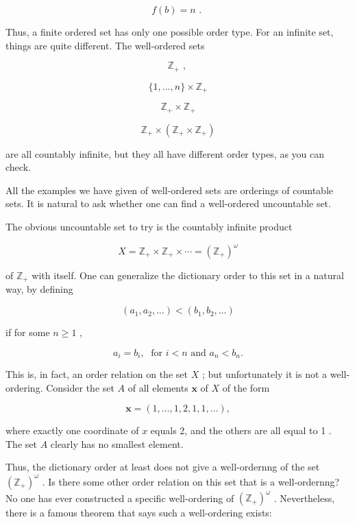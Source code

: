 \documentclass[10pt]{article}
\begin{document}
\[
f\left( b\right)  = n\text{ . }
\]

Thus, a finite ordered set has only one possible order type. For an infinite set, things are quite different. The well-ordered sets

\[
{\mathbb{Z}}_{ + }\text{ , }
\]

\[
\{ 1,\ldots ,n\}  \times  {\mathbb{Z}}_{ + }
\]

\[
{\mathbb{Z}}_{ + } \times  {\mathbb{Z}}_{ + }
\]

\[
{\mathbb{Z}}_{ + } \times  \left( {{\mathbb{Z}}_{ + } \times  {\mathbb{Z}}_{ + }}\right)
\]

are all countably infinite, but they all have different order types, as you can check.

All the examples we have given of well-ordered sets are orderings of countable sets. It is natural to ask whether one can find a well-ordered uncountable set.

The obvious uncountable set to try is the countably infinite product

\[
X = {\mathbb{Z}}_{ + } \times  {\mathbb{Z}}_{ + } \times  \cdots  = {\left( {\mathbb{Z}}_{ + }\right) }^{\omega }
\]

of \({\mathbb{Z}}_{ + }\) with itself. One can generalize the dictionary order to this set in a natural way, by defining

\[
\left( {{a}_{1},{a}_{2},\ldots }\right)  < \left( {{b}_{1},{b}_{2},\ldots }\right)
\]

if for some \(n \geq  1\) ,

\[
{a}_{i} = {b}_{i},\;\text{ for }i < n\text{ and }{a}_{n} < {b}_{n}.
\]

This is, in fact, an order relation on the set \(X\) ; but unfortunately it is not a well-ordering. Consider the set \(A\) of all elements \(\mathbf{x}\) of \(X\) of the form

\[
\mathbf{x} = \left( {1,\ldots ,1,2,1,1,\ldots }\right) ,
\]

where exactly one coordinate of \(x\) equals 2, and the others are all equal to 1 . The set \(A\) clearly has no smallest element.

Thus, the dictionary order at least does not give a well-ordernng of the set \({\left( {\mathbb{Z}}_{ + }\right) }^{\omega }\) . Is there some other order relation on this set that is a well-ordernng? No one has ever constructed a specific well-ordering of \({\left( {\mathbb{Z}}_{ + }\right) }^{\omega }\) . Nevertheless, there is a famous theorem that says such a well-ordering exists:
\end{document}
